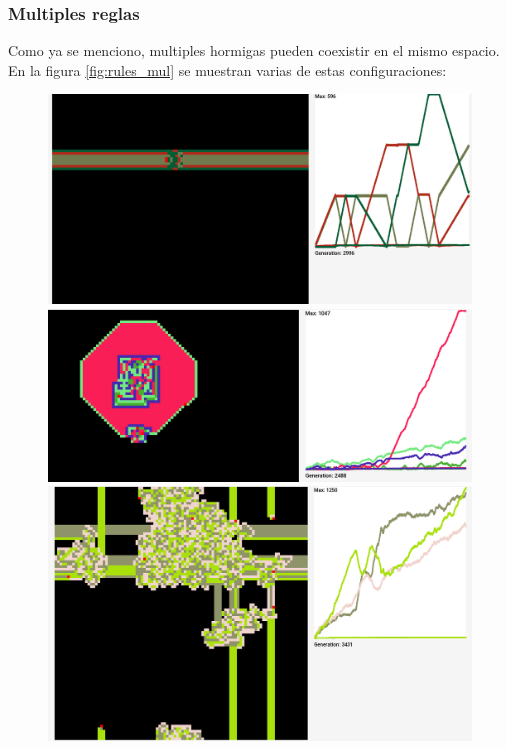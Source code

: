 \documentclass[12pt,twoside]{article}
\begin{document}
\subsubsection{Multiples reglas}
Como ya se menciono, multiples hormigas pueden coexistir en el mismo espacio. En la figura \ref{fig:rules_mul} se muestran varias de estas configuraciones:
\begin{figure}[h!]
	\centering
	
	\begin{minipage}{0.6\textwidth}
		\centering
		\includegraphics[width=1.3\textwidth]{img/mul_1.png}
	\end{minipage}%
	\vspace{0.3cm}
	
	\begin{minipage}{0.6\textwidth}
		\centering
		\includegraphics[width=1.3\textwidth]{img/mul_2.png}
	\end{minipage}
	\vspace{0.3cm}
	
	\begin{minipage}{0.6\textwidth}
		\centering
		\includegraphics[width=1.3\textwidth]{img/mul_3.png}
	\end{minipage}
	\vspace{0.3cm}


\end{figure}
\end{document}
